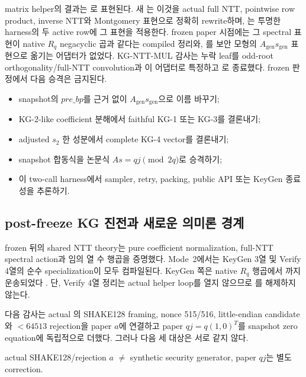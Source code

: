 matrix helper의 결과는 로
표현된다. 새 는 이것을 actual full
NTT, pointwise row product, inverse NTT와 Montgomery 표현으로 정확히 rewrite하며,
는 투명한 harness의 두 active
row에 그 표현을 적용한다.
frozen paper 시점에는 그 spectral 표현이 native \(R_q\) negacyclic 곱과 같다는
compiled 정리와, 를 보안 모형의
\(A_{\mathrm{gen}}s_{\mathrm{gen}}\) 표현으로 옮기는 어댑터가 없었다.
KG-NTT-MUL 감사는 누락 leaf를 odd-root orthogonality/full-NTT convolution과
이 어댑터로 특정하고 로 종료했다. frozen 판정에서
다음 승격은 금지된다.

\begin{itemize}
  \item snapshot의 \(\mathit{pre\_bp}\)를 근거 없이
        \(A_{\mathrm{gen}}s_{\mathrm{gen}}\)으로 이름 바꾸기;
  \item KG-2-like coefficient 분해에서 faithful KG-1 또는 KG-3를 결론내기;
  \item adjusted \(s_2\) 한 성분에서 complete KG-4 vector를 결론내기;
  \item snapshot 합동식을 논문식 \(A s=qj\pmod{2q}\)로 승격하기;
  \item 이 two-call harness에서 sampler, retry, packing, public API 또는 KeyGen
        종료성을 추론하기.
\end{itemize}

\subsection{post-freeze KG 진전과 새로운 의미론 경계}

frozen 뒤의 shared NTT theory는 pure coefficient normalization, full-NTT
spectral action과 임의 열 수 행곱을 증명했다. Mode~2에서는 KeyGen 3열 및 Verify
4열의 순수 specialization이 모두 컴파일된다. KeyGen 쪽은 native \(R_q\) 행곱에서
까지 운송되었다
\cite{post-freeze-kg-rq-haetae-report}. 단, Verify 4열 정리는 actual helper
loop를 열지 않으므로 \FrozenPaperGate 를 해제하지 않는다.

다음 감사는 actual 의 SHAKE128 framing, nonce 515/516,
little-endian candidate와 \(<64513\) rejection을 paper \(a\)에 연결하고 paper
\(qj=q(1,0)^T\)를 snapshot zero equation에 독립적으로 더했다. 그러나 다음 세
대상은 서로 같지 않다.

\begin{center}
actual SHAKE128/rejection \(a\)
\(\neq\) synthetic security generator,
\qquad paper \(qj\)는 별도 correction.
\end{center}


